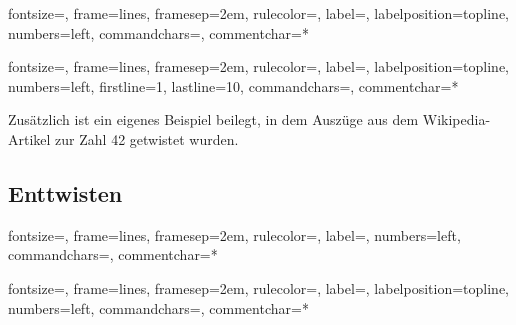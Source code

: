 \documentclass[a4paper, notitlepage, 12pt]{scrartcl}
\begin{document}
%
{fontsize=\footnotesize,
	frame=lines,  %
	framesep=2em, %
	rulecolor=\color{Gray},
	label=,
	labelposition=topline,
	numbers=left,
	commandchars=\|\(\), %
	commentchar=*        %
}
\begingroup
{}
\endgroup

%
{fontsize=\footnotesize,
	frame=lines,  %
	framesep=2em, %
	rulecolor=\color{Gray},
	label=,
	labelposition=topline,
	numbers=left,
	firstline=1,
	lastline=10,
	commandchars=\|\(\), %
	commentchar=*        %
}
\begingroup
{}
\endgroup

Zusätzlich ist ein eigenes Beispiel beilegt, in dem Auszüge aus dem Wikipedia-Artikel zur Zahl 42 getwistet wurden.
\subsection{Enttwisten}
%
{fontsize=\footnotesize,
	frame=lines,  %
	framesep=2em, %
	rulecolor=\color{Gray},
	label=,
	numbers=left,
	commandchars=\|\(\), %
	commentchar=*        %
}
\begingroup
{}
\endgroup

%
{fontsize=\footnotesize,
	frame=lines,  %
	framesep=2em, %
	rulecolor=\color{Gray},
	label=,
	labelposition=topline,
	numbers=left,
	commandchars=\|\(\), %
	commentchar=*        %
}
\begingroup
{}
\endgroup
\end{document}
